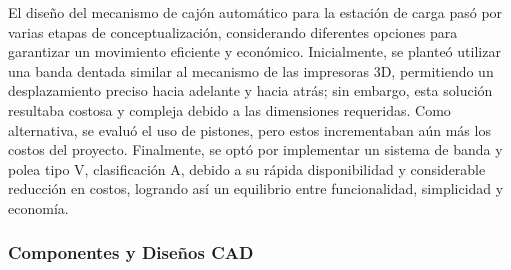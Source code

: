 El diseño del mecanismo de cajón automático para la estación de carga pasó por varias etapas de conceptualización, considerando diferentes opciones para garantizar un movimiento eficiente y económico. Inicialmente, se planteó utilizar una banda dentada similar al mecanismo de las impresoras 3D, permitiendo un desplazamiento preciso hacia adelante y hacia atrás; sin embargo, esta solución resultaba costosa y compleja debido a las dimensiones requeridas. Como alternativa, se evaluó el uso de pistones, pero estos incrementaban aún más los costos del proyecto. Finalmente, se optó por implementar un sistema de banda y polea tipo V, clasificación A, debido a su rápida disponibilidad y considerable reducción en costos, logrando así un equilibrio entre funcionalidad, simplicidad y economía.

\subsubsection{Componentes y Diseños CAD}
